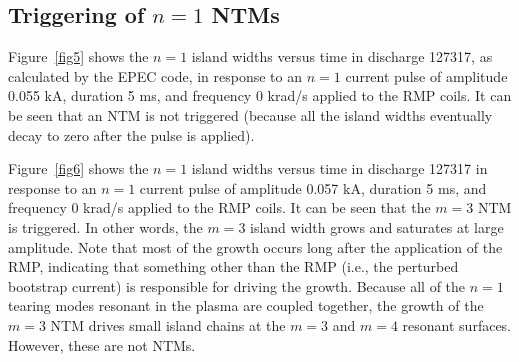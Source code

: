 \documentclass[12pt,prb,aps]{revtex4-1}
\begin{document}
\subsection{Triggering of $n=1$ NTMs}
Figure~\ref{fig5} shows the $n=1$ island widths versus time in discharge 127317, as calculated by the EPEC code, 
in response to an $n=1$ current pulse of amplitude 0.055 kA, duration 5 ms, and frequency 0 krad/s applied to the
RMP coils. It can be seen that an NTM is not triggered (because all the island widths eventually decay to zero after the pulse is
applied). 

Figure~\ref{fig6} shows the $n=1$ island widths versus time in discharge 127317 
in response to an $n=1$ current pulse of amplitude 0.057 kA, duration 5 ms, and frequency 0 krad/s applied to the
RMP coils. It can be seen that the $m=3$ NTM is triggered. In other words, the $m=3$ island width grows and
saturates at large amplitude. Note that most of the growth occurs long after the application of the RMP, indicating
that something other than the RMP (i.e., the perturbed bootstrap current) is responsible for driving the growth. Because all of the
$n=1$ tearing modes resonant in the plasma are coupled together, the growth of the $m=3$ NTM drives small
island chains at the $m=3$ and $m=4$ resonant surfaces. However, these are not NTMs. 
\end{document}
